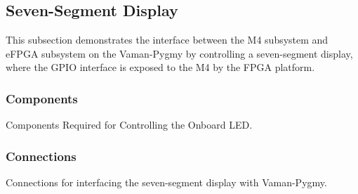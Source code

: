 \subsection{Seven-Segment Display}
This subsection demonstrates the interface between the M4 subsystem and eFPGA
subsystem on the Vaman-Pygmy by controlling a seven-segment display, where the
GPIO interface is exposed to the M4 by the FPGA platform.

\subsubsection{Components}
\begin{table}[!ht]
    \centering
    
    \caption{Components Required for Controlling the Onboard LED.}
    \label{tab:m4-fpga-sevenseg-components}
\end{table}

\subsubsection{Connections}
\begin{table}[!ht]
    \centering
    
    \caption{Connections for interfacing the seven-segment display with Vaman-Pygmy.}
    \label{tab:m4-fpga-sevenseg-connections}
\end{table}

